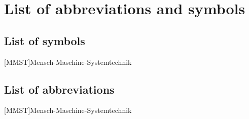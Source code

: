 \section*{List of abbreviations and symbols}

\subsection*{List of symbols}
	\begin{acronym}[MMST1]
		{Mensch-Maschine-Systemtechnik}
	\end{acronym}
\subsection*{List of abbreviations}
	\begin{acronym}[MMST2]
		{Mensch-Maschine-Systemtechnik}
	\end{acronym}